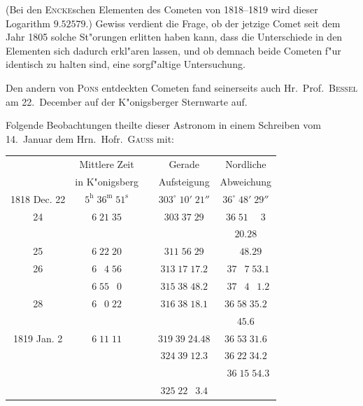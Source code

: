 \documentclass[12pt,a4paper]{article}
\begin{document}
(Bei den \textsc{Encke}schen Elementen des Cometen von 1818--1819 wird dieser Logarithm $9.52579$.)
Gewiss verdient die Frage, ob der jetzige Comet seit dem Jahr 1805 solche St"orungen erlitten haben kann,
dass die Unterschiede in den Elementen sich dadurch erkl"aren lassen, und ob demnach beide Cometen
f"ur identisch zu halten sind, eine sorgf"altige Untersuchung.

Den andern von \textsc{Pons} entdeckten Cometen fand seinerseits auch Hr.~Prof.~\textsc{Bessel} am 22.~December
auf der K"onigsberger Sternwarte auf.

Folgende Beobachtungen theilte dieser Astronom in einem Schreiben vom 14.~Januar dem Hrn.~Hofr.~\textsc{Gauss} mit:

\begin{center}
\small
\begin{tabular}{c|c|c|c|c}
\toprule
& Mittlere Zeit & & Gerade & Nordliche \\
& in K"onigsberg & & Aufsteigung & Abweichung \\
\midrule
1818 Dec. 22 & $5^{\mathrm{h}}\;36^{\mathrm{m}}\;51^{\mathrm{s}}$ & & $303^{\circ}\;10'\;21''$ & $36^{\circ}\;48'\;29''$ \\
\phantom{22} 24 & $6\;21\;35$ & & $303\;37\;29$ & $36\;51\;\phantom{0}\phantom{0}3$ \\
\phantom{22} & & & & \phantom{0}\phantom{0}\phantom{0}\phantom{0}$20.28$ \\
\phantom{22} 25 & $6\;22\;20$ & & $311\;56\;29$ & \phantom{0}\phantom{0}$\phantom{0}\phantom{0}48.29$ \\
\phantom{22} 26 & $6\;\phantom{0}4\;56$ & & $313\;17\;17.2$ & \phantom{0}$\phantom{0}37\;\phantom{0}7\;53.1$ \\
\phantom{22} & $6\;55\;\phantom{0}0$ & & $315\;38\;48.2$ & \phantom{0}$\phantom{0}37\;\phantom{0}4\;\phantom{0}1.2$ \\
\phantom{22} 28 & $6\;\phantom{0}0\;22$ & & $316\;38\;18.1$ & $36\;58\;35.2$ \\
\phantom{22} & & & & \phantom{0}\phantom{0}\phantom{0}\phantom{0}$45.6$ \\
1819 Jan. \phantom{0}2 & $6\;11\;11$ & & $319\;39\;24.48$ & $36\;53\;31.6$ \\
\phantom{0}\phantom{0} & & & $324\;39\;12.3$ & $36\;22\;34.2$ \\
\phantom{0}\phantom{0} & & & & \phantom{0}$\phantom{0}36\;15\;54.3$ \\
\phantom{0}\phantom{0} & & & $325\;22\;\phantom{0}3.4$ & \\
\bottomrule
\end{tabular}
\end{center}
\end{document}
